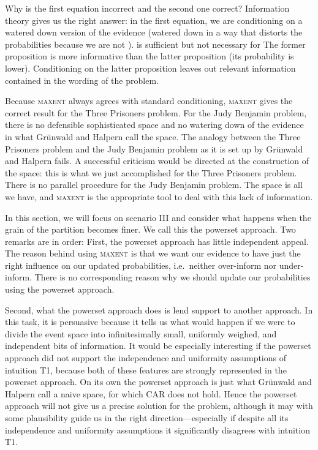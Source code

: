 \documentclass[12pt]{article}
\begin{document}
\nial Why is the first equation incorrect and the second one correct?
Information theory gives us the right answer: in the first equation,
we are conditioning on a watered down version of the evidence (watered
down in a way that distorts the probabilities because we are not
). 
is sufficient but not necessary for  The
former proposition is more informative than the latter proposition
(its probability is lower). Conditioning on the latter proposition
leaves out relevant information contained in the wording of the
problem.

Because \textsc{maxent} always agrees with standard conditioning,
\textsc{maxent} gives the correct result for the Three Prisoners
problem. For the Judy Benjamin problem, there is no defensible
sophisticated space and no watering down of the evidence in what
Gr{\"u}nwald and Halpern call the  space. The analogy
between the Three Prisoners problem and the Judy Benjamin problem as
it is set up by Gr{\"u}nwald and Halpern fails. A successful criticism
would be directed at the construction of the  space: this
is what we just accomplished for the Three Prisoners problem. There is
no parallel procedure for the Judy Benjamin problem. The 
space is all we have, and \textsc{maxent} is the appropriate tool to
deal with this lack of information.

\medskip


\smallskip

\nias In this section, we will focus on scenario III and consider what
happens when the grain of the partition becomes finer. We call this
the powerset approach. Two remarks are in order: First, the powerset
approach has little independent appeal. The reason behind using
\textsc{maxent} is that we want our evidence to have just the right
influence on our updated probabilities, i.e.\ neither over-inform
nor under-inform. There is no corresponding reason why we should
update our probabilities using the powerset approach.

Second, what the powerset approach does is lend support to another
approach. In this task, it is persuasive because it tells us what
would happen if we were to divide the event space into infinitesimally
small, uniformly weighed, and independent  bits of
information. It would be especially interesting if the powerset
approach did not support the independence and uniformity assumptions
of intuition T1, because both of these features are strongly
represented in the powerset approach. On its own the powerset approach
is just what Gr{\"u}nwald and Halpern call a naive space, for which
CAR does not hold. Hence the powerset approach will not give us a
precise solution for the problem, although it may with some
plausibility guide us in the right direction---especially if despite
all its independence and uniformity assumptions it significantly
disagrees with intuition T1.
\end{document}
